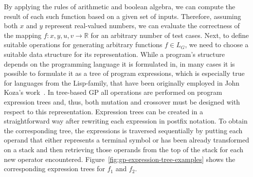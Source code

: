 By applying the rules of arithmetic and boolean algebra, we can compute the result of each such function based on a given set of inputs.
Therefore, assuming both $x$ and $y$ represent real-valued numbers, we can evaluate the correctness of the mapping $f : x, y, u, v \to \mathbb{R}$ for an arbitrary number of test cases.
Next, to define suitable operations for generating arbitrary functions $f \in L_G$, we need to choose a suitable data structure for its representation.
While a program's structure depends on the programming language it is formulated in, in many cases it is possible to formulate it as a tree of program expressions, which is especially true for languages from the Lisp-family, that have been originally employed in John Koza's work~\cite{koza1994genetic}.
In tree-based GP all operations are performed on program expression trees and, thus, both mutation and crossover must be designed with respect to this representation.
Expression trees can be created in a straightforward way after rewriting each expression in postfix notation. 
To obtain the corresponding tree, the expressions is traversed sequentially by putting each operand that either represents a terminal symbol or has been already transformed on a stack and then retrieving those operands from the top of the stack for each new operator encountered.
Figure~\ref{fig:gp-expression-tree-examples} shows the corresponding expression trees for $f_1$ and $f_2$.
